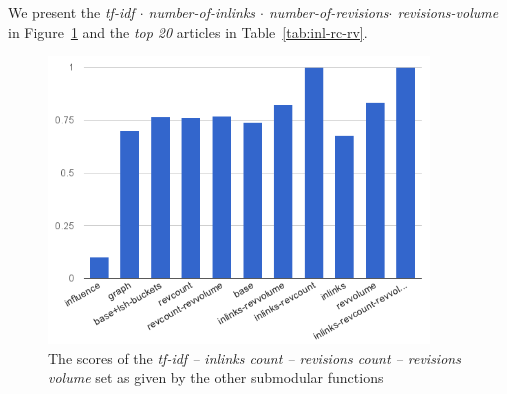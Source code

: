 We present the \emph{tf-idf \(\cdot\) number-of-inlinks \(\cdot\)
number-of-revisions\(\cdot\) revisions-volume} in Figure~\ref{img:inl-rc-rv}
and the \emph{top 20} articles in Table~\ref{tab:inl-rc-rv}.
\begin{figure}
  \centering
  \includegraphics[width=0.9\textwidth,natwidth=555,natheight=419]{images/inl-rc-rv.png}
  \caption{The scores of the \emph{tf-idf -- inlinks count -- revisions count
  -- revisions volume} set as given by the other submodular functions}
  \label{img:inl-rc-rv}
\end{figure}

